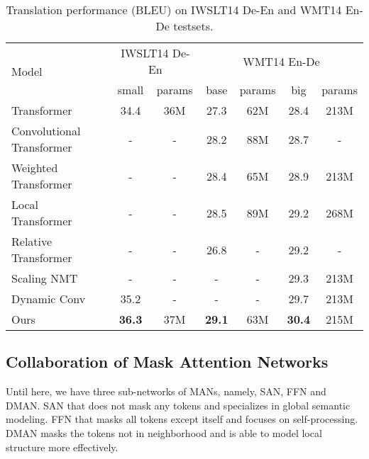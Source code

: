 \documentclass[11pt]{article}
\begin{document}
\begin{comment}
Next, we show that the mask matrix in Equation~\ref{dynamic-mask-matrix} is the intermediate state of SAN and FFN. Let  and , respectively. We can easily infer that for fixed  and :


The result demonstrates that the two extreme states of  have the same functions with  and , respectively. In other words, SAN and FFN are different extreme states of DMAN. Intuitively, if we set the capacity of neighborhood small enough, DMAN degenerates into FFN; if the capacity is large enough, DMAN changes into SAN. 
\end{comment}

\begin{table*}
\begin{center}
\begin{tabular}{lcccccc}
\midrule[1.0pt]
\multirow{2}{*}{Model} &\multicolumn{2}{c}{IWSLT14 De-En} &\multicolumn{4}{c}{WMT14 En-De}\\
&small &params &base &params &big &params \\
\midrule[1.0pt]
Transformer~\cite{vaswani2017attention} &34.4 &36M &27.3 &62M &28.4 &213M \\
Convolutional Transformer~\cite{yang2019convolutional} &- &- &28.2 &88M &28.7 &-  \\
Weighted Transformer~\cite{ahmed2017weighted} &- &- &28.4 &65M &28.9 &213M \\
Local Transformer~\cite{yang2018modeling} &- &- &28.5 &89M &29.2 &268M \\
Relative Transformer~\cite{shaw2018self} &- &- &26.8 &- &29.2 &- \\
Scaling NMT~\cite{ott2018scaling} &- &- &- &- &29.3 &213M \\
Dynamic Conv~\cite{wu2019pay} &35.2 &- &- &- &29.7 &213M \\
\midrule[1.0pt]
Ours &\textbf{36.3} &37M & \textbf{29.1} &63M & \textbf{30.4} &215M \\
\midrule[1.0pt]
\end{tabular}
\end{center}
\caption{Translation performance (BLEU) on IWSLT14 De-En and WMT14 En-De testsets.}
\label{translation-result}
\end{table*}

\subsection{Collaboration of Mask Attention Networks}
\label{collaboration-of-mask-attention-network-family}
Until here, we have three sub-networks of MANs, namely, SAN, FFN and DMAN. SAN that does not mask any tokens and specializes in global semantic modeling. FFN that masks all tokens except itself and focuses on self-processing. DMAN masks the tokens not in neighborhood and is able to model local structure more effectively. 
\end{document}
